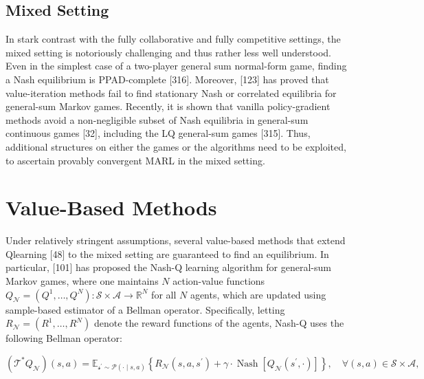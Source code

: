 \documentclass[10pt]{article}
\begin{document}
\subsection{Mixed Setting}
In stark contrast with the fully collaborative and fully competitive settings, the mixed setting is notoriously challenging and thus rather less well understood. Even in the simplest case of a two-player general sum normal-form game, finding a Nash equilibrium is PPAD-complete [316]. Moreover, [123] has proved that value-iteration methods fail to find stationary Nash or correlated equilibria for general-sum Markov games. Recently, it is shown that vanilla policy-gradient methods avoid a non-negligible subset of Nash equilibria in general-sum continuous games [32], including the LQ general-sum games [315]. Thus, additional structures on either the games or the algorithms need to be exploited, to ascertain provably convergent MARL in the mixed setting.

\section{Value-Based Methods}
Under relatively stringent assumptions, several value-based methods that extend Qlearning [48] to the mixed setting are guaranteed to find an equilibrium. In particular, [101] has proposed the Nash-Q learning algorithm for general-sum Markov games, where one maintains $N$ action-value functions $Q_{\mathcal{N}}=\left(Q^{1}, \ldots, Q^{N}\right): \mathcal{S} \times \mathcal{A} \rightarrow \mathbb{R}^{N}$ for all $N$ agents, which are updated using sample-based estimator of a Bellman operator. Specifically, letting $R_{\mathcal{N}}=\left(R^{1}, \ldots, R^{N}\right)$ denote the reward functions of the agents, Nash-Q uses the following Bellman operator:

\[
\left(\mathcal{T}^{*} Q_{\mathcal{N}}\right)(s, a)=\mathbb{E}_{\mathcal{s}^{\prime} \sim \mathcal{P}(\cdot \mid s, a)}\left\{R_{\mathcal{N}}\left(s, a, s^{\prime}\right)+\gamma \cdot \operatorname{Nash}\left[Q_{\mathcal{N}}\left(s^{\prime}, \cdot\right)\right]\right\}, \quad \forall(s, a) \in \mathcal{S} \times \mathcal{A},
\]
\end{document}
